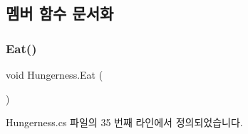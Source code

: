 \subsection{멤버 함수 문서화}
\mbox{\label{class_hungerness_a84a1577cd9995fa6b719e14295e8ee7d}} 
\subsubsection{\texorpdfstring{Eat()}{Eat()}}
{\footnotesize\ttfamily void Hungerness.\+Eat (\begin{DoxyParamCaption}{ }\end{DoxyParamCaption})}



Hungerness.\+cs 파일의 35 번째 라인에서 정의되었습니다.


